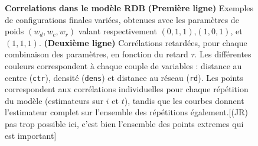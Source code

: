 \begin{figure}
{\textbf{Correlations dans le modèle RDB} \textbf{(Première ligne)} Exemples de configurations finales variées, obtenues avec les paramètres de poids $(w_{d},w_{c},w_{r})$ valant respectivement $(0,1,1)$,$(1,0,1)$, et $(1,1,1)$. \textbf{(Deuxième ligne)} Corrélations retardées, pour chaque combinaison des paramètres, en fonction du retard $\tau$. Les différentes couleurs correspondent à chaque couple de variables : distance au centre (\texttt{ctr}), densité (\texttt{dens}) et distance au réseau (\texttt{rd}). Les points correspondent aux corrélations individuelles pour chaque répétition du modèle (estimateurs sur $i$ et $t$), tandis que les courbes donnent l'estimateur complet sur l'ensemble des répétitions également.[(JR) pas trop possible ici, c'est bien l'ensemble des points extremes qui est important]\label{fig:causalityregimes:exrdb}}  
\end{figure}



